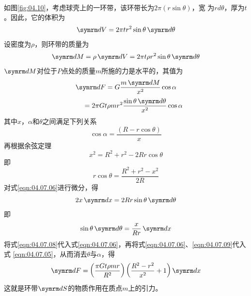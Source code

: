 如图\ref{fig:04.10}，考虑球壳上的一环带，该环带长为$ 2 \pi ( r \sin \theta ) $，宽
为$ r d \theta $，厚为$ t $。因此，它的体积为
\begin{equation*}
 \dif V = 2 \pi t r ^ { 2 } \sin \theta \dif \theta
\end{equation*}
设密度为$ \rho $，则环带的质量为
\begin{equation*}
 \dif M = \rho \dif V = 2 \pi t \rho r ^ { 2 } \sin \theta \dif \theta
\end{equation*}
$ \dif M $对位于$ P $点处的质量$ m $所施的力是水平的，其值为
\begin{equation*}
        \dif F = G \frac { m \dif M } { x ^ { 2 } } \cos \alpha \\
\end{equation*}
\begin{equation}\label{eqn:04.07.05}
        \mbox{} \qquad = 2 \pi G t \rho m r ^ { 2 } \frac { \sin \theta \dif \theta } { x ^ { 2 } } \cos \alpha
\end{equation}
其中$ x $，$ \alpha $和$ \theta $之间满足下列关系
\begin{equation}\label{eqn:04.07.06}
 \cos \alpha = \frac { ( R - r \cos \theta ) } { x }
\end{equation}
再根据余弦定理
\begin{equation}\label{eqn:04.07.07}
 x ^ { 2 } = R ^ { 2 } + r ^ { 2 } - 2 R r \cos \theta
\end{equation}
即
\begin{equation}\label{eqn:04.07.08}
 r \cos \theta = \frac { R ^ { 2 } + r ^ { 2 } - x ^ { 2 } } { 2 R }
\end{equation}
对式\eqref{eqn:04.07.06}进行微分，得
\begin{equation*}
 2 x \dif x = 2 R r \sin \theta \dif \theta
\end{equation*}
即
\begin{equation}\label{eqn:04.07.09}
 \sin \theta \dif \theta = \frac { x } { R r } \dif x
\end{equation}
将式\eqref{eqn:04.07.08}代入式\eqref{eqn:04.07.06}，再将式\eqref{eqn:04.07.06}、\eqref{eqn:04.07.09}代入式
\eqref{eqn:04.07.05}，从而消去$ \theta $与$ \alpha $，得
\begin{equation}\label{eqn:04.07.10}
 \dif F = \left( \frac { \pi G t \rho m r } { R ^ { 2 } } \right) \left( \frac { R ^ { 2 } - r ^ { 2 } } { x ^ { 2 } } + 1 \right) \dif x
\end{equation}
这就是环带$ \dif S $的物质作用在质点$ m $上的引力。

